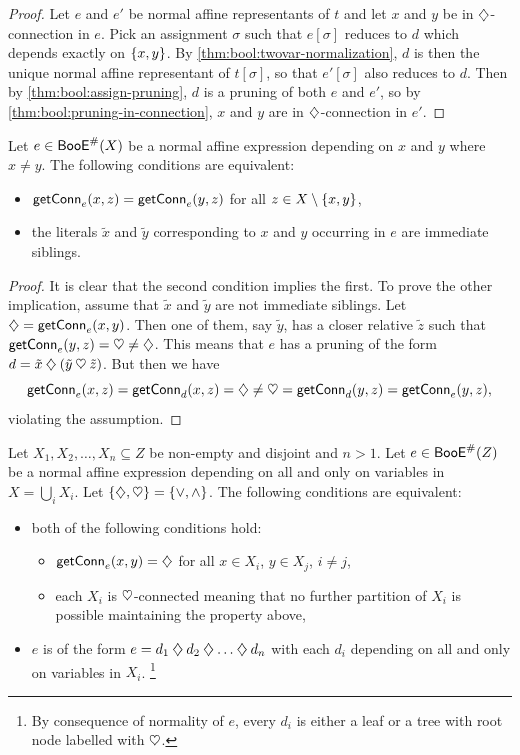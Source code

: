 \documentclass[a4paper]{memoir}
\begin{document}
\begin{proof}
	Let $e$ and $e'$ be normal affine representants of $t$ and let $x$ and $y$ be in $\mathbin{\diamondsuit}$-connection in $e$.
	Pick an assignment $\sigma$ such that $e[\sigma]$ reduces to $d$ which depends exactly on $\mathopen{}\left\{ x, y \right\}\mathclose{}$.
	By \cref{thm:bool:twovar-normalization}, $d$ is then the unique normal affine representant of $t[\sigma]$, so that $e'[\sigma]$ also reduces to $d$.
	Then by \cref{thm:bool:assign-pruning}, $d$ is a pruning of both $e$ and $e'$, so by \cref{thm:bool:pruning-in-connection}, $x$ and $y$ are in $\mathbin{\diamondsuit}$-connection in $e'$.
\end{proof}
\begin{lemma} \label{thm:bool:char-siblings}
	Let $e \in \mathsf{BooE}^\#(X)$ be a normal affine expression depending on $x$ and $y$ where $x \neq y$.
	The following conditions are equivalent:
	\begin{itemize}
		\item $\mathsf{getConn}_{e}(x, z) = \mathsf{getConn}_{e}(y, z)$ for all $z \in X \setminus \mathopen{}\left\{ x, y \right\}\mathclose{}$,
		\item the literals $\tilde x$ and $\tilde y$ corresponding to $x$ and $y$ occurring in $e$ are immediate siblings.
	\end{itemize}
\end{lemma}
\begin{proof}
	It is clear that the second condition implies the first.
	To prove the other implication, assume that $\tilde x$ and $\tilde y$ are not immediate siblings. Let ${\mathbin{\diamondsuit}} = \mathsf{getConn}_{e}(x, y)$. Then one of them, say $\tilde y$, has a closer relative $\tilde z$ such that $\mathsf{getConn}_{e}(y, z) = {\mathbin{\heartsuit}} \neq {\mathbin{\diamondsuit}}$.
	This means that $e$ has a pruning of the form $d = \tilde x \mathbin{\diamondsuit} (\tilde y \mathbin{\heartsuit} \tilde z)$.
	But then we have
	\[
		\mathsf{getConn}_{e}(x, z) = \mathsf{getConn}_{d}(x, z) = {\mathbin{\diamondsuit}} \neq {\mathbin{\heartsuit}} = \mathsf{getConn}_{d}(y, z) = \mathsf{getConn}_{e}(y, z),
	\]
	violating the assumption.
\end{proof}
\begin{lemma} \label{thm:bool:char-root-node}
	Let $X_1, X_2, \ldots, X_n \subseteq Z$ be non-empty and disjoint and $n > 1$.
	Let $e \in \mathsf{BooE}^\#(Z)$ be a normal affine expression depending on all and only on variables in $X = \bigcup_i X_i$.
	Let $\mathopen{}\left\{ {\mathbin{\diamondsuit}}, {\mathbin{\heartsuit}} \right\}\mathclose{} = \mathopen{}\left\{ {\vee}, {\wedge} \right\}\mathclose{}$.
	The following conditions are equivalent:
	\begin{itemize}
		\item both of the following conditions hold:
		\begin{itemize}
			\item $\mathsf{getConn}_{e}(x, y) = \mathbin{\diamondsuit}$ for all $x \in X_i$, $y \in X_j$, $i \neq j$,
			\item each $X_i$ is $\mathbin{\heartsuit}$-connected meaning that no further partition of $X_i$ is possible maintaining the property above,
		\end{itemize}
		\item $e$ is of the form $e = d_1 \mathbin{\diamondsuit} d_2 \mathbin{\diamondsuit} \ldots \mathbin{\diamondsuit} d_n$ with each $d_i$ depending on all and only on variables in $X_i$.%
		\footnote{By consequence of normality of $e$, every $d_i$ is either a leaf or a tree with root node labelled with $\mathbin{\heartsuit}$.}
	\end{itemize}
\end{lemma}
\end{document}
